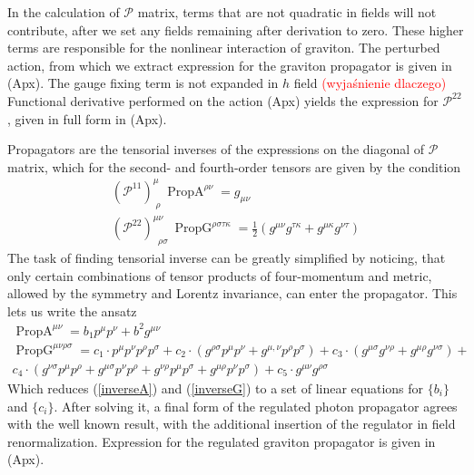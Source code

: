 \documentclass[11pt, a4paper]{article}
\begin{document}
In the calculation of $\mathcal{P}$ matrix, terms that are not quadratic in fields will not contribute, after we set any fields remaining after derivation to zero.
These higher terms are responsible for the nonlinear interaction of graviton. The perturbed action, from which we extract expression
for the graviton propagator is given in (Apx). The gauge fixing term is not expanded in $h$ field \textcolor{red}{(wyjaśnienie dlaczego)}
Functional derivative performed on the action (Apx) yields the expression for
$\mathcal{P}^{2 2}$, given in full form in (Apx).

Propagators are the tensorial inverses of the expressions on the diagonal of $\mathcal{P}$ matrix, which for
the second- and fourth-order tensors are given by the condition
\begin{gather}
    \left(\mathcal{P}^{1 1}\right)^{\mu}_{ \; \rho} \ \operatorname{PropA}^{\rho \nu}  = g_{\mu \nu} \label{inverseA}\\
    \left(\mathcal{P}^{2 2}\right)^{\mu\nu}_{ \; \; \rho \sigma} \ \operatorname{PropG}^{\rho \sigma \tau \kappa} = \frac{1}{2} \left( g^{\mu\nu} g^{\tau\kappa} + g^{\mu\kappa} g^{\nu\tau} \right) \label{inverseG}
\end{gather}
The task of finding tensorial inverse can be greatly simplified by noticing, that only certain combinations of tensor
products of four-momentum and metric, allowed by the symmetry and Lorentz invariance, can enter the propagator.
This lets us write the ansatz
\begin{gather}
    \operatorname{PropA}^{\mu \nu} = b_1 p^{\mu} p^{\nu} + b^2 g^{\mu\nu}\\
    \operatorname{PropG}^{\mu \nu \rho \sigma} =
    c_1 \cdot p^{\mu} p^{\nu}
   p^{\rho} p^{\sigma} + c_2 \cdot
   (g^{\rho \sigma} p^{\mu}
   p^{\nu} + g^{\mu,\nu}
   p^{\rho} p^{\sigma})+c_3 \cdot
   (g^{\mu \sigma} g^{\nu\rho} + g^{\mu \rho}
   g^{\nu\sigma})+ \\ c_4 \cdot (g^{\nu\sigma}
   p^{\mu}
   p^{\rho}+g^{\mu\sigma}
   p^{\nu}
   p^{\rho} +g^{\nu\rho}
   p^{\mu}
   p^{\sigma}+g^{\mu\rho}
   p^{\nu} p^{\sigma})+c_5 \cdot
   g^{\mu \nu} g^{\rho\sigma}
\end{gather}
Which reduces (\ref*{inverseA}) and (\ref*{inverseG}) to a set of linear equations for $\{b_i\}$ and $\{c_i\}$.
After solving it, a final form of the regulated photon propagator agrees with the well known result, with the additional insertion of the regulator in field renormalization.
Expression for the regulated graviton propagator is given in (Apx).
\end{document}
